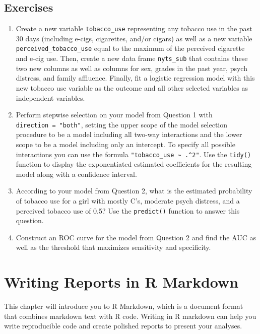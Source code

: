 \documentclass[
  letterpaper,
]{krantz}
\begin{document}
\hypertarget{exercises-9}{%
\section{Exercises}\label{exercises-9}}

\begin{enumerate}
\def\labelenumi{\arabic{enumi}.}
\item
  Create a new variable \texttt{tobacco\_use} representing any tobacco
  use in the past 30 days (including e-cigs, cigarettes, and/or cigars)
  as well as a new variable \texttt{perceived\_tobacco\_use} equal to
  the maximum of the perceived cigarette and e-cig use. Then, create a
  new data frame \texttt{nyts\_sub} that contains these two new columns
  as well as columns for sex, grades in the past year, psych distress,
  and family affluence. Finally, fit a logistic regression model with
  this new tobacco use variable as the outcome and all other selected
  variables as independent variables.
\item
  Perform stepwise selection on your model from Question 1 with
  \texttt{direction\ =\ "both"}, setting the upper scope of the model
  selection procedure to be a model including all two-way interactions
  and the lower scope to be a model including only an intercept. To
  specify all possible interactions you can use the formula
  \texttt{"tobacco\_use\ \textasciitilde{}\ .\^{}2"}. Use the
  \texttt{tidy()} function to display the exponentiated estimated
  coefficients for the resulting model along with a confidence interval.
\item
  According to your model from Question 2, what is the estimated
  probability of tobacco use for a girl with mostly C's, moderate psych
  distress, and a perceived tobacco use of 0.5? Use the
  \texttt{predict()} function to answer this question.
\item
  Construct an ROC curve for the model from Question 2 and find the AUC
  as well as the threshold that maximizes sensitivity and specificity.
\end{enumerate}


\hypertarget{sec-rmarkdown}{%
\chapter{Writing Reports in R Markdown}\label{sec-rmarkdown}}

This chapter will introduce you to R Markdown, which is a document
format that combines markdown text with R code. Writing in R markdown
can help you write reproducible code and create polished reports to
present your analyses.
\end{document}
